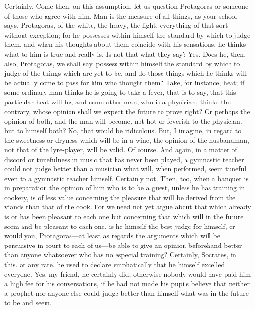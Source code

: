 \documentclass[letterpaper,12pt]{article}
\newcommand{\stephpag}[1]{\marginnote{\small\itshape\fontfamily{ppl}\selectfont #1}}
\begin{document}
\begin{drama}
\theodorusspeaks
Certainly.
\socratesspeaks
Come then, on this assumption, let us question Protagoras or someone of those who agree with him. Man is the measure of all things, as your school says, Protagoras, of the white, the heavy, the light, everything of that sort without exception; for he possesses within himself the standard by which to judge them, and when his thoughts about them coincide with his sensations, he thinks what to him is true and really is. Is not that what they say?
\theodorusspeaks
Yes.
\socratesspeaks
Does he, then, also, Protagoras, we shall say, possess within himself the standard by which to judge of the things which are yet to be, and do those things \stephpag{c} which he thinks will be actually come to pass for him who thought them? Take, for instance, heat; if some ordinary man thinks he is going to take a fever, that is to say, that this particular heat will be, and some other man, who is a physician, thinks the contrary, whose opinion shall we expect the future to prove right? Or perhaps the opinion of both, and the man will become, not hot or feverish to the physician, but to himself both?
\theodorusspeaks
No, that would be ridiculous.
\socratesspeaks
But, I imagine, in regard to the sweetness or dryness \stephpag{d} which will be in a wine, the opinion of the husbandman, not that of the lyre-player, will be valid.
\theodorusspeaks
Of course.
\socratesspeaks
And again, in a matter of discord or tunefulness in music that has never been played, a gymnastic teacher could not judge better than a musician what will, when performed, seem tuneful even to a gymnastic teacher himself.
\theodorusspeaks
Certainly not.
\socratesspeaks
Then, too, when a banquet is in preparation the opinion of him who is to be a guest, unless he has training in cookery, is of less value concerning the pleasure that will be derived from the viands than that of the cook. \stephpag{e} For we need not yet argue about that which already is or has been pleasant to each one but concerning that which will in the future seem and be pleasant to each one, is he himself the best judge for himself, or would you, Protagoras—at least as regards the arguments which will be persuasive in court to each of us—be able to give an opinion beforehand better than anyone whatsoever who has no especial training?
\theodorusspeaks
Certainly, Socrates, in this, at any rate, he used to declare emphatically that he himself excelled everyone.
\socratesspeaks
Yes, my friend, he certainly did; otherwise nobody would have paid him a high fee \stephpag{179 a} for his conversations, if he had not made his pupils believe that neither a prophet nor anyone else could judge better than himself what was in the future to be and seem.

\end{drama}
\end{document}
